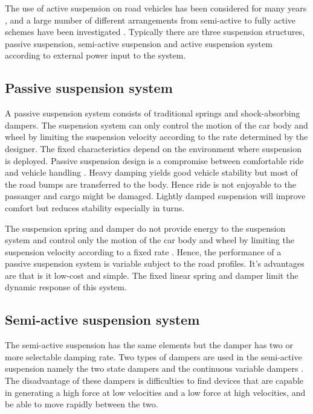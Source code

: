 \documentclass[10pt,twocolumn]{witseiepaper}
\begin{document}
The use of active suspension on road vehicles has been considered for many years \cite{Thompson:1970}, and a large number of different arrangements from semi-active to fully active schemes have been investigated \cite{Sharp:1987}. Typically there are three suspension structures, passive suspension, semi-active suspension and active suspension system according to external power input to the system.

\subsection{Passive suspension system} 

A passive suspension system consists of traditional springs and shock-absorbing dampers. The suspension system can only control the motion of the car body and wheel by limiting the suspension velocity according to the rate determined by the designer. The fixed characteristics depend on the environment where suspension is deployed. Passive suspension design is a compromise between comfortable ride and vehicle handling \cite{Williams:1994}. Heavy damping yields good vehicle stability but most of the road bumps are transferred to the body. Hence ride is not enjoyable to the passanger and cargo might be damaged. Lightly damped suspension will improve comfort but reduces stability especially in turns.

The suspension spring and damper do not provide energy to the suspension system and control only the motion of the car body and wheel by limiting the suspension velocity according to a fixed rate \cite{Wright:1984}. Hence, the performance of a passive suspension system is variable subject to the road profiles. It's advantages are that is it low-cost and simple. The fixed linear spring and damper limit the dynamic response of this system.

\subsection{Semi-active suspension system} 

The semi-active suspension has the same elements but the damper has two or more selectable damping rate. Two types of dampers are used in the semi-active suspension namely the two state dampers and the continuous variable dampers \cite{Donahue:1998}. The disadvantage of these dampers is difficulties to find devices that are capable in generating a high force at low velocities and a low force at high velocities, and be able to move rapidly between the two. 
\end{document}

